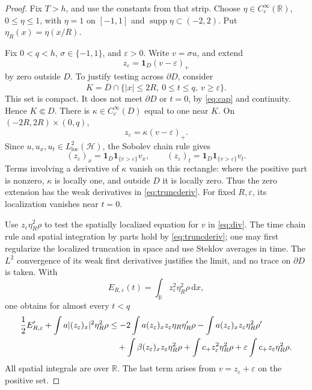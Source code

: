 \documentclass[11pt,reqno]{amsart}
\numberwithin{equation}{section}
\theoremstyle{definition}
\theoremstyle{remark}
\newcommand{\R}{\mathbb R}
\newcommand{\HH}{\mathcal H}
\newcommand{\loc}{\mathrm{loc}}
\newcommand{\supp}{\operatorname{supp}}
\newcommand{\dd}{\,\mathrm d}
\newcommand{\ind}{\mathbf 1}
\begin{document}
\begin{proof}
Fix $T>h$, and use the constants from that strip. Choose $\eta\in C_c^\infty(\R)$, $0\leq\eta\leq1$, with $\eta=1$ on $[-1,1]$ and $\supp\eta\subset(-2,2)$. Put $\eta_R(x)=\eta(x/R)$.

Fix $0<q<h$, $\sigma\in\{-1,1\}$, and $\varepsilon>0$. Write $v=\sigma u$, and extend
\[
 z_\varepsilon=\ind_D(v-\varepsilon)_+
\]
by zero outside $D$. To justify testing across $\partial D$, consider
\[
 K=\overline D\cap\{|x|\leq2R,\ 0\leq t\leq q,\ v\geq\varepsilon\}.
\]
This set is compact. It does not meet $\partial D$ or $t=0$, by \eqref{eq:cap} and continuity. Hence $K\Subset D$. There is $\kappa\in C_c^\infty(D)$ equal to one near $K$. On $(-2R,2R)\times(0,q)$,
\[
 z_\varepsilon=\kappa(v-\varepsilon)_+.
\]
Since $u,u_x,u_t\in L^2_\loc(\HH)$, the Sobolev chain rule gives
\begin{equation}\label{eq:truncderiv}
 (z_\varepsilon)_x=\ind_D\ind_{\{v>\varepsilon\}}v_x,
 \qquad
 (z_\varepsilon)_t=\ind_D\ind_{\{v>\varepsilon\}}v_t.
\end{equation}
Terms involving a derivative of $\kappa$ vanish on this rectangle: where the positive part is nonzero, $\kappa$ is locally one, and outside $D$ it is locally zero. Thus the zero extension has the weak derivatives in \eqref{eq:truncderiv}. For fixed $R,\varepsilon$, its localization vanishes near $t=0$.

Use $z_\varepsilon\eta_R^2\rho$ to test the spatially localized equation for $v$ in \eqref{eq:div}. The time chain rule and spatial integration by parts hold by
\eqref{eq:truncderiv}; one may first regularize the localized truncation
in space and use Steklov averages in time.  The $L^2$ convergence of its
weak first derivatives justifies the limit, and no trace on
$\partial D$ is taken. With
\[
 E_{R,\varepsilon}(t)=\int_\R z_\varepsilon^2\eta_R^2\rho\dd x,
\]
one obtains for almost every $t<q$
\begin{align}
 \frac12 E_{R,\varepsilon}'
 +\int a|(z_\varepsilon)_x|^2\eta_R^2\rho
 &\leq-2\int a(z_\varepsilon)_xz_\varepsilon\eta_R\eta_R'\rho
 -\int a(z_\varepsilon)_xz_\varepsilon\eta_R^2\rho'\notag\\
 &\quad+\int\beta(z_\varepsilon)_xz_\varepsilon\eta_R^2\rho
 +\int c_+z_\varepsilon^2\eta_R^2\rho
 +\varepsilon\int c_+z_\varepsilon\eta_R^2\rho.
 \label{eq:capenergy}
\end{align}
All spatial integrals are over $\R$. The last term arises from $v=z_\varepsilon+\varepsilon$ on the positive set.


\end{proof}
\end{document}
